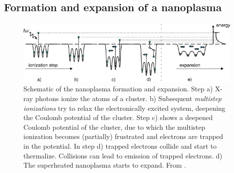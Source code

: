\subsection{Formation and expansion of a nanoplasma}\label{sec:nanoplasma-expansion}
\begin{figure}
	\centering
		\includegraphics[width=1.00\textwidth]{images/nano-plasma-schematic.jpg}
	\caption[Schematic of the nanoplasma formation and expansion.]{Schematic of the nanoplasma formation and expansion. Step a) X-ray photons ionize the atoms of a cluster. b) Subsequent \textit{multistep ionizations} try to relax the electronically excited system, deepening the Coulomb potential of the cluster. Step c) shows a deepened Coulomb potential of the cluster, due to which the multistep ionization becomes (partially) frustrated and electrons are trapped in the potential. In step d) trapped electrons collide and start to thermalize. Collisions can lead to emission of trapped electrons. d) The superheated nanoplasma starts to expand. From \citep[\href{https://creativecommons.org/licenses/by/3.0/}{\ccby}]{Arbeiter-2011-NJP}.}
	\label{fig:nano-plasma-schematic}
\end{figure}
